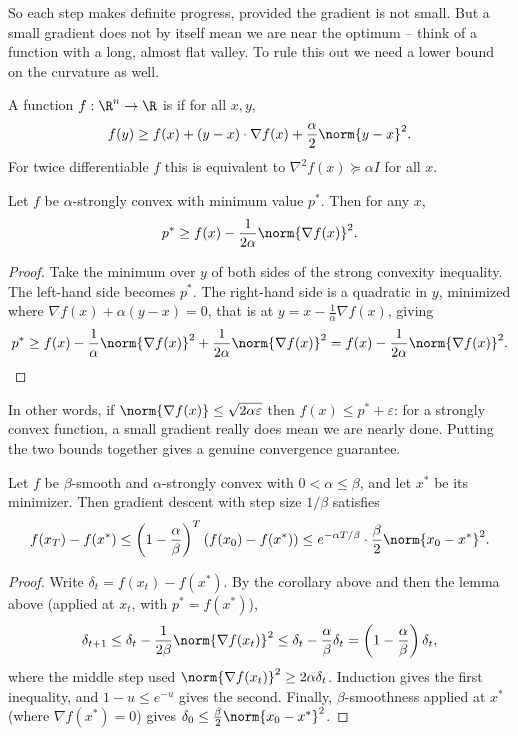 \documentclass[a4paper]{scrartcl}
\begin{document}
So each step makes definite progress, provided the gradient is not small. But a small gradient does not by itself mean we are near the optimum -- think of a function with a long, almost flat valley. To rule this out we need a lower bound on the curvature as well.

\begin{definition}
    A function $f : \R^n \rightarrow \R$ is  if for all $x, y$,
    $$
    f(y) \geq f(x) + (y - x)\cdot \nabla f(x) + \frac{\alpha}{2}\norm{y - x}^2.
    $$
    For twice differentiable $f$ this is equivalent to $\nabla^2 f(x) \succeq \alpha I$ for all $x$.
\end{definition}

\begin{lemma}
    Let $f$ be $\alpha$-strongly convex with minimum value $p^*$. Then for any $x$,
    $$
    p^* \geq f(x) - \frac{1}{2\alpha}\norm{\nabla f(x)}^2.
    $$
\end{lemma}
\begin{proof}
    Take the minimum over $y$ of both sides of the strong convexity inequality. The left-hand side becomes $p^*$. The right-hand side is a quadratic in $y$, minimized where $\nabla f(x) + \alpha(y - x) = 0$, that is at $y = x - \frac{1}{\alpha}\nabla f(x)$, giving
    $$
    p^* \geq f(x) - \frac{1}{\alpha}\norm{\nabla f(x)}^2 + \frac{1}{2\alpha}\norm{\nabla f(x)}^2 = f(x) - \frac{1}{2\alpha}\norm{\nabla f(x)}^2. \qedhere
    $$
\end{proof}

In other words, if $\norm{\nabla f(x)} \leq \sqrt{2\alpha\varepsilon}$ then $f(x) \leq p^* + \varepsilon$: for a strongly convex function, a small gradient really does mean we are nearly done. Putting the two bounds together gives a genuine convergence guarantee.

\begin{theorem}
    Let $f$ be $\beta$-smooth and $\alpha$-strongly convex with $0 < \alpha \leq \beta$, and let $x^*$ be its minimizer. Then gradient descent with step size $1/\beta$ satisfies
    $$
    f(x_T) - f(x^*) \leq \left(1 - \frac{\alpha}{\beta}\right)^T\left(f(x_0) - f(x^*)\right) \leq e^{-\alpha T/\beta}\cdot\frac{\beta}{2}\norm{x_0 - x^*}^2.
    $$
\end{theorem}
\begin{proof}
    Write $\delta_t = f(x_t) - f(x^*)$. By the corollary above and then the lemma above (applied at $x_t$, with $p^* = f(x^*)$),
    $$
    \delta_{t+1} \leq \delta_t - \frac{1}{2\beta}\norm{\nabla f(x_t)}^2 \leq \delta_t - \frac{\alpha}{\beta}\delta_t = \left(1 - \frac{\alpha}{\beta}\right)\delta_t,
    $$
    where the middle step used $\norm{\nabla f(x_t)}^2 \geq 2\alpha \delta_t$. Induction gives the first inequality, and $1 - u \leq e^{-u}$ gives the second. Finally, $\beta$-smoothness applied at $x^*$ (where $\nabla f(x^*) = 0$) gives $\delta_0 \leq \frac{\beta}{2}\norm{x_0 - x^*}^2$.
\end{proof}
\end{document}

